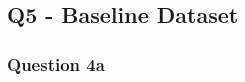 
\subsection{Q5 - Baseline Dataset}\label{subsec:q5}
\subsubsection{Question 4a}\label{subsubsec:q4a}
